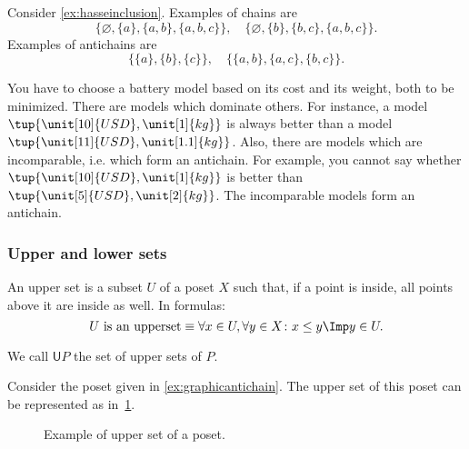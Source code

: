 \begin{example}
Consider \cref{ex:hasseinclusion}. Examples of chains are 
\begin{equation}
    \{\varnothing,\{a\},\{a,b\},\{a,b,c\}\}, \quad  \{\varnothing,\{b\},\{b,c\},\{a,b,c\}\}.
\end{equation}
Examples of antichains are
\begin{equation}
    \{\{a\},\{b\},\{c\}\}, \quad \{ \{a,b\},\{a,c\}, \{b,c\}\}.
\end{equation}
\end{example}

\begin{example}
\label{ex:battery}
You have to choose a battery model based on its cost and its weight, both to be minimized. There are models which dominate others. For instance, a model $\tup{\unit[10]{USD},\unit[1]{kg}}$ is always better than a model $\tup{\unit[11]{USD},\unit[1.1]{kg}}$. Also, there are models which are incomparable, i.e. which form an antichain. For example, you cannot say whether $\tup{\unit[10]{USD},\unit[1]{kg}}$ is better than  $\tup{\unit[5]{USD},\unit[2]{kg}}$. The incomparable models form an antichain.
\end{example}

\subsubsection{Upper and lower sets}

\begin{definition}
\label{def:upperset}An upper set is a subset $U$ of a poset $X$ such
that, if a point is inside, all points above it are inside as well.
In formulas:
\begin{equation}
\text{$U$ is an upperset} \equiv \forall x\in U, \forall y\in X\colon x\leq y \Imp y\in U.
\end{equation}
\end{definition}
\begin{remark}
We call $\mathsf{U}P$ the set of upper sets of $P$.
\end{remark}
\begin{example}
Consider the poset given in \cref{ex:graphicantichain}. The upper set of this poset can be represented as in~\cref{fig:upperset}.

\begin{figure}[h!]
\begin{center}
\end{center}
\caption{Example of upper set of a poset. \label{fig:upperset}}
\end{figure}
\end{example}

